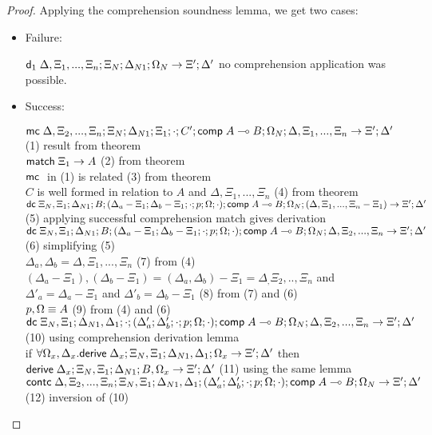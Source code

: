 \begin{proof}
   Applying the comprehension soundness lemma, we get two cases:
   
   \begin{itemize}
      \item Failure:
      
      $\mathsf{d}_1 \; \Delta, \Xi_1, ..., \Xi_n; \Xi_N; \Delta_{N1}; \Omega_N \rightarrow \Xi'; \Delta'$ \hfill no comprehension application was possible.
      
      \item Success:
      
      $\mathsf{mc} \; \Delta, \Xi_2, ..., \Xi_n; \Xi_N; \Delta_{N1}; \Xi_1; \cdot; C'; \mathsf{comp} \; A \multimap B; \Omega_N; \Delta, \Xi_1, ..., \Xi_n \rightarrow \Xi'; \Delta'$ \hfill (1) result from theorem \\
      $\mathsf{match} \; \Xi_1 \rightarrow A$ \hfill (2) from theorem \\
      $\mathsf{mc} \;$ in (1) is related \hfill (3) from theorem \\
      $C$ is well formed in relation to $A$ and $\Delta, \Xi_1, ..., \Xi_n$ \hfill (4) from theorem \\
      
      $\mathsf{dc} \; \Xi_N, \Xi_1; \Delta_{N1}; B; (\Delta_a - \Xi_1; \Delta_b - \Xi_1; \cdot; p; \Omega; \cdot); \mathsf{comp} \; A \multimap B; \Omega_N; (\Delta, \Xi_1, ..., \Xi_n - \Xi_1) \rightarrow \Xi'; \Delta'$ \hfill (5) applying successful comprehension match gives derivation \\
      $\mathsf{dc} \; \Xi_N, \Xi_1; \Delta_{N1}; B; (\Delta_a - \Xi_1; \Delta_b - \Xi_1; \cdot; p; \Omega; \cdot); \mathsf{comp} \; A \multimap B; \Omega_N; \Delta, \Xi_2, ..., \Xi_n \rightarrow \Xi'; \Delta'$ \hfill (6) simplifying (5) \\
      $\Delta_a, \Delta_b = \Delta, \Xi_1, ..., \Xi_n$ \hfill (7) from (4) \\
      $(\Delta_a - \Xi_1), (\Delta_b - \Xi_1) = (\Delta_a, \Delta_b) - \Xi_1 = \Delta_, \Xi_2, .., \Xi_n$ and $\Delta'_a = \Delta_a - \Xi_1$ and $\Delta'_b = \Delta_b - \Xi_1$ \hfill (8) from (7) and (6) \\
      $p, \Omega \equiv A$ \hfill (9) from (4) and (6) \\
      $\mathsf{dc} \; \Xi_N, \Xi_1; \Delta_{N1}, \Delta_1; \cdot; (\Delta'_a; \Delta'_b; \cdot; p; \Omega; \cdot); \mathsf{comp} \; A \multimap B; \Omega_N; \Delta, \Xi_2, ..., \Xi_n \rightarrow \Xi'; \Delta'$ \hfill (10) using comprehension derivation lemma \\
      if $\forall \Omega_x, \Delta_x. \mathsf{derive} \; \Delta_x; \Xi_N, \Xi_1; \Delta_{N1}, \Delta_1; \Omega_x \rightarrow \Xi'; \Delta'$ then $\mathsf{derive} \; \Delta_x; \Xi_N, \Xi_1; \Delta_{N1}; B, \Omega_x \rightarrow \Xi'; \Delta'$ \hfill (11) using the same lemma \\ 
      $\mathsf{contc} \; \Delta, \Xi_2, ..., \Xi_n; \Xi_N, \Xi_1; \Delta_{N1}, \Delta_1; (\Delta'_a; \Delta'_b; \cdot; p; \Omega; \cdot); \mathsf{comp} \; A \multimap B; \Omega_N \rightarrow \Xi'; \Delta'$ \hfill (12) inversion of (10) \\
      

\end{itemize}
\end{proof}
